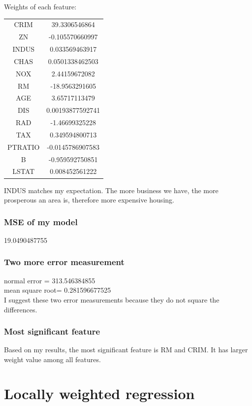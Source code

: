 \documentclass[letterpaper]{article}
\begin{document}
Weights of each feature: \\
\begin{center}
\begin{tabular}{ |c|c| } 
 \hline
CRIM  & 39.3306546864 \\
ZN & -0.105570660997\\
INDUS  & 0.033569463917\\
CHAS & 0.0501338462503\\
NOX & 2.44159672082\\
RM  &-18.9563291605\\
AGE  & 3.65717113479\\
DIS & 0.00193877592741\\
RAD  & -1.46699325228\\
TAX & 0.349594800713\\
PTRATIO  &-0.0145786907583\\
B & -0.959592750851\\
LSTAT & 0.008452561222\\
 \hline
\end{tabular}
\end{center}
INDUS matches my expectation. The more business we have, the more prosperous an area is, therefore more expensive housing.

\subsubsection{MSE of my model}
19.0490487755

\subsubsection{Two more error measurement}

normal error = 313.546384855\\
mean square root= 0.281596677525\\
I suggest these two error measurements because they do not square the differences.


\subsubsection{Most significant feature}
Based on my results, the most significant feature is RM and CRIM. It has larger weight value among all features.
 



\section{Locally weighted regression}
\end{document}
